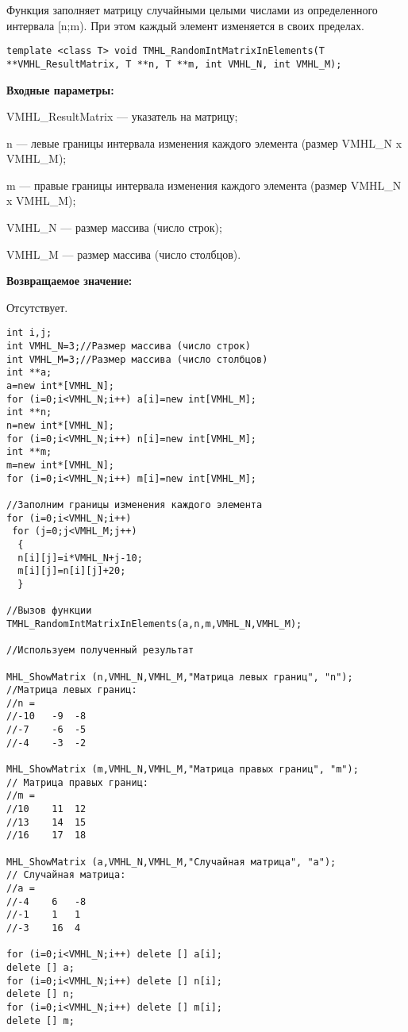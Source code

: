 \documentclass[a4paper,12pt]{article}
\begin{document}
Функция заполняет матрицу случайными целыми числами из определенного интервала [n;m). При этом каждый элемент изменяется в своих пределах.


\begin{lstlisting}[label=code_syntax_TMHL_RandomIntMatrixInElements,caption=Синтаксис]
template <class T> void TMHL_RandomIntMatrixInElements(T **VMHL_ResultMatrix, T **n, T **m, int VMHL_N, int VMHL_M);
\end{lstlisting}

\textbf{Входные параметры:}
 
VMHL\_ResultMatrix --- указатель на матрицу;
 
n --- левые границы интервала изменения каждого элемента (размер VMHL\_N x VMHL\_M);
 
m --- правые границы интервала изменения каждого элемента (размер VMHL\_N x VMHL\_M);
 
VMHL\_N --- размер массива (число строк);
 
VMHL\_M --- размер массива (число столбцов).

\textbf{Возвращаемое значение:}

Отсутствует.


\begin{lstlisting}[label=code_use_TMHL_RandomIntMatrixInElements,caption=Пример использования]
int i,j;
int VMHL_N=3;//Размер массива (число строк)
int VMHL_M=3;//Размер массива (число столбцов)
int **a;
a=new int*[VMHL_N];
for (i=0;i<VMHL_N;i++) a[i]=new int[VMHL_M];
int **n;
n=new int*[VMHL_N];
for (i=0;i<VMHL_N;i++) n[i]=new int[VMHL_M];
int **m;
m=new int*[VMHL_N];
for (i=0;i<VMHL_N;i++) m[i]=new int[VMHL_M];

//Заполним границы изменения каждого элемента
for (i=0;i<VMHL_N;i++)
 for (j=0;j<VMHL_M;j++)
  {
  n[i][j]=i*VMHL_N+j-10;
  m[i][j]=n[i][j]+20;
  }

//Вызов функции
TMHL_RandomIntMatrixInElements(a,n,m,VMHL_N,VMHL_M);

//Используем полученный результат

MHL_ShowMatrix (n,VMHL_N,VMHL_M,"Матрица левых границ", "n");
//Матрица левых границ:
//n =
//-10	-9	-8
//-7	-6	-5
//-4	-3	-2

MHL_ShowMatrix (m,VMHL_N,VMHL_M,"Матрица правых границ", "m");
// Матрица правых границ:
//m =
//10	11	12
//13	14	15
//16	17	18

MHL_ShowMatrix (a,VMHL_N,VMHL_M,"Случайная матрица", "a");
// Случайная матрица:
//a =
//-4	6	-8
//-1	1	1
//-3	16	4

for (i=0;i<VMHL_N;i++) delete [] a[i];
delete [] a;
for (i=0;i<VMHL_N;i++) delete [] n[i];
delete [] n;
for (i=0;i<VMHL_N;i++) delete [] m[i];
delete [] m;
\end{lstlisting}
\end{document}
